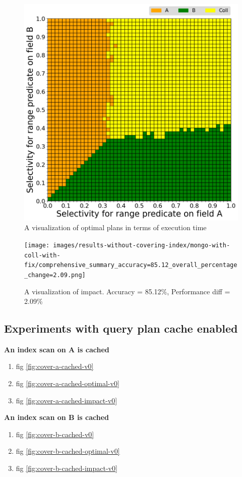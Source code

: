 \begin{figure}[htb]
    \centering
    \includegraphics[width=0.6\linewidth]{images/results-without-covering-index/mongo-with-coll-with-fix/comprehensive_practical_winner.png}
    \caption{A visualization of optimal plans in terms of execution time}
    \label{fig:mongo-with-coll-v2}
\end{figure}

\begin{figure}[htb]
    \centering
    \texttt{[image: images/results-without-covering-index/mongo-with-coll-with-fix/comprehensive\_summary\_accuracy=85.12\_overall\_percentage\_change=2.09.png]}
    \caption{A visualization of impact. Accuracy = 85.12\%, Performance diff = 2.09\%}
    \label{fig:mongo-with-fix-v2}
\end{figure}






\subsection{Experiments with query plan cache enabled}

\noindent\textbf{An index scan on A is cached}
\begin{enumerate}
    \item fig \ref{fig:cover-a-cached-v0}
    \item fig \ref{fig:cover-a-cached-optimal-v0}
    \item fig \ref{fig:cover-a-cached-impact-v0}
\end{enumerate}

\noindent\textbf{An index scan on B is cached}
\begin{enumerate}
    \item fig \ref{fig:cover-b-cached-v0}
    \item fig \ref{fig:cover-b-cached-optimal-v0}
    \item fig \ref{fig:cover-b-cached-impact-v0}
\end{enumerate}

